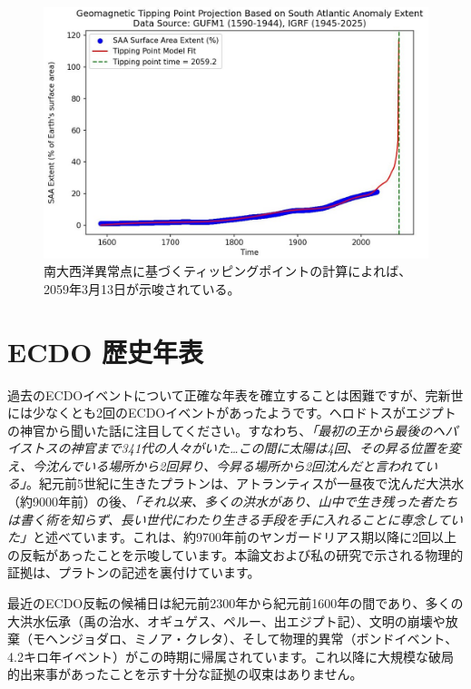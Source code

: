 \documentclass[10pt,twocolumn,letterpaper]{article}
\begin{document}
\begin{figure}[t]
\begin{center}
   \includegraphics[width=1\linewidth]{saa-crop.jpeg}
\end{center}
   \caption{南大西洋異常点に基づくティッピングポイントの計算によれば、2059年3月13日が示唆されている\cite{125,126}。}
\label{fig:16}
\label{fig:onecol}
\end{figure}

\section{ECDO 歴史年表}

過去のECDOイベントについて正確な年表を確立することは困難ですが、完新世には少なくとも2回のECDOイベントがあったようです。ヘロドトスがエジプトの神官から聞いた話に注目してください。すなわち、\textit{「最初の王から最後のヘパイストスの神官まで341代の人々がいた…この間に太陽は4回、その昇る位置を変え、今沈んでいる場所から2回昇り、今昇る場所から2回沈んだと言われている」}\cite{32}。紀元前5世紀に生きたプラトン\cite{111}は、アトランティスが一昼夜で沈んだ大洪水（約9000年前）の後、\textit{「それ以来、多くの洪水があり、山中で生き残った者たちは書く術を知らず、長い世代にわたり生きる手段を手に入れることに専念していた」}\cite{112}と述べています。これは、約9700年前のヤンガードリアス期以降に2回以上の反転があったことを示唆しています。本論文および私の研究\cite{2}で示される物理的証拠は、プラトンの記述を裏付けています。

最近のECDO反転の候補日は紀元前2300年から紀元前1600年の間であり、多くの大洪水伝承（禹の治水\cite{113,114,115}、オギュゲス\cite{116,117}、ペルー\cite{118,119}、出エジプト記\cite{120}）、文明の崩壊や放棄（モヘンジョダロ\cite{121}、ミノア・クレタ\cite{100,101}）、そして物理的異常（ボンドイベント\cite{122}、4.2キロ年イベント\cite{90}）がこの時期に帰属されています。これ以降に大規模な破局的出来事があったことを示す十分な証拠の収束はありません。
\end{document}

